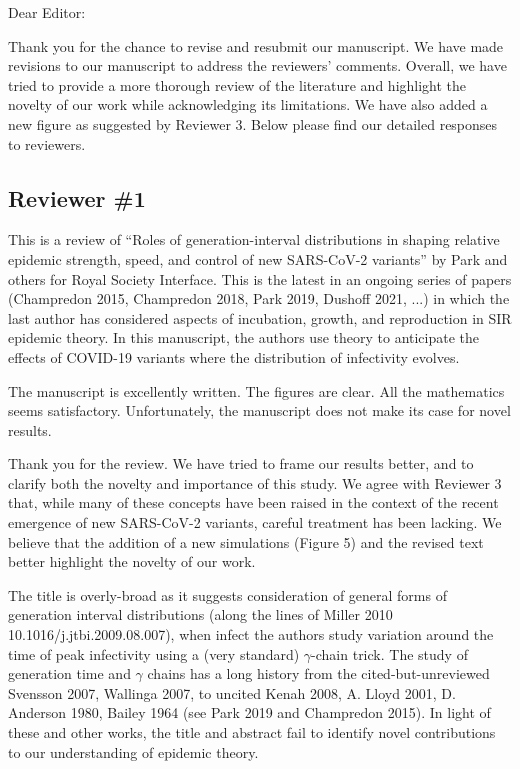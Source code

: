 \documentclass[12pt]{article}
\newcommand{\rev}{\subsection*}
\newcommand{\revtext}{\textsf}
\begin{document}
\noindent Dear Editor:

Thank you for the chance to revise and resubmit our manuscript. 
We have made revisions to our manuscript to address the reviewers' comments.
Overall, we have tried to provide a more thorough review of the literature and highlight the novelty of our work while acknowledging its limitations.
We have also added a new figure as suggested by Reviewer 3.
Below please find our detailed responses to reviewers.

\rev{Reviewer \#1}

\revtext{This is a review of ``Roles of generation-interval distributions in shaping relative epidemic strength, speed, and control of new SARS-CoV-2 variants'' by Park and others for Royal Society Interface.  This is the latest in an ongoing series of papers (Champredon 2015, Champredon 2018, Park 2019, Dushoff 2021, ...) in which the last author has considered aspects of incubation, growth, and reproduction in SIR epidemic theory.  In this manuscript, the authors use theory to anticipate the effects of COVID-19 variants where the distribution of infectivity evolves.}

\revtext{The manuscript is excellently written. The figures are clear.  All the mathematics seems satisfactory.  Unfortunately, the manuscript does not make its case for novel results.}

Thank you for the review.
We have tried to frame our results better, and to clarify both the novelty and importance of this study.
We agree with Reviewer 3 that, while many of these concepts have been raised in the context of the recent emergence of new SARS-CoV-2 variants, careful treatment has been lacking. 
We believe that the addition of a new simulations (Figure 5) and the revised text better highlight the novelty of our work.

\revtext{The title is overly-broad as it suggests consideration of general forms of generation interval distributions (along the lines of Miller 2010 10.1016/j.jtbi.2009.08.007), when infect the authors study variation around the time of peak infectivity using a (very standard) $\gamma$-chain trick.  The study of generation time and $\gamma$ chains has a long history from the cited-but-unreviewed Svensson 2007, Wallinga 2007, to uncited Kenah 2008, A.  Lloyd 2001, D. Anderson 1980, Bailey 1964 (see Park 2019 and Champredon 2015).  In light of these and other works, the title and abstract fail to identify novel contributions to our understanding of epidemic theory.}
\end{document}
